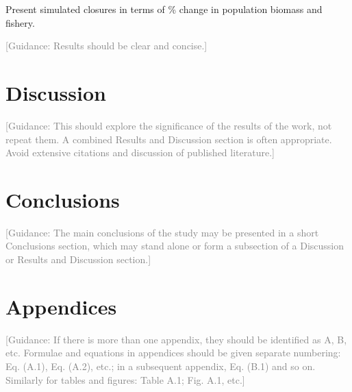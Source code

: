 \documentclass[review]{elsarticle}
\begin{document}
Present simulated closures in terms of \% change in population biomass and
fishery.

\textcolor{gray}{[Guidance: Results should be clear and concise.]}

\section{Discussion}

\textcolor{gray}{[Guidance: This should explore the significance of the results 
of the work, not repeat them. A combined Results and Discussion section is
often appropriate.  Avoid extensive citations and discussion of published
literature.]}

\section{Conclusions}

\textcolor{gray}{[Guidance: The main conclusions of the study may be presented 
in a short Conclusions section, which may stand alone or form a subsection of a
Discussion or Results and Discussion section.]}

\section*{Appendices}

\textcolor{gray}{[Guidance: If there is more than one appendix, they should 
be identified as A, B, etc.  Formulae and equations in appendices should be
given separate numbering: Eq.  (A.1), Eq. (A.2), etc.; in a subsequent
appendix, Eq. (B.1) and so on.  Similarly for tables and figures: Table A.1;
Fig. A.1, etc.]}
\end{document}

